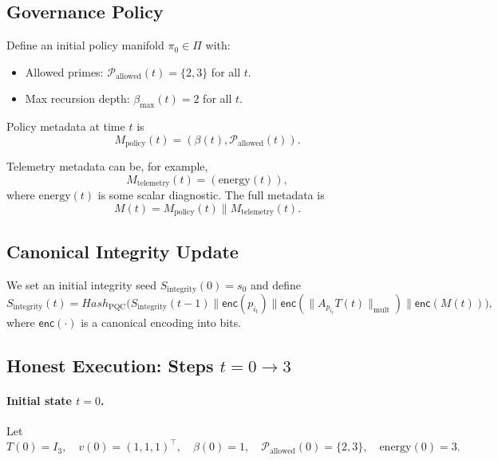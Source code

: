 \documentclass[11pt]{article}
\begin{document}
\subsection{Governance Policy}

Define an initial policy manifold \(\pi_0 \in \Pi\) with:

\begin{itemize}[leftmargin=1.5em]
  \item Allowed primes: \(\mathcal{P}_{\text{allowed}}(t) = \{2,3\}\) for all \(t\).
  \item Max recursion depth: \(\beta_{\max}(t) = 2\) for all \(t\).
\end{itemize}

Policy metadata at time \(t\) is
\[
  M_{\text{policy}}(t) = (\beta(t), \mathcal{P}_{\text{allowed}}(t)).
\]

Telemetry metadata can be, for example,
\[
  M_{\text{telemetry}}(t) = (\text{energy}(t)),
\]
where \(\text{energy}(t)\) is some scalar diagnostic.
The full metadata is
\[
  M(t) = M_{\text{policy}}(t) \parallel M_{\text{telemetry}}(t).
\]

\subsection{Canonical Integrity Update}

We set an initial integrity seed \(S_{\text{integrity}}(0) = s_0\) and define
\begin{equation}
  S_{\text{integrity}}(t)
  =
  Hash_{\text{PQC}}\Big(
    S_{\text{integrity}}(t-1)
    \parallel \mathsf{enc}(p_{i_t})
    \parallel \mathsf{enc}(\|A_{p_{i_t}}T(t)\|_{\text{mult}})
    \parallel \mathsf{enc}(M(t))
  \Big),
\end{equation}
where \(\mathsf{enc}(\cdot)\) is a canonical encoding into bits.

\subsection{Honest Execution: Steps \(t=0 \to 3\)}

\paragraph{Initial state \(t=0\).}

Let
\[
  T(0) = I_3, \quad
  v(0) = (1,1,1)^\top, \quad
  \beta(0) = 1, \quad
  \mathcal{P}_{\text{allowed}}(0) = \{2,3\}, \quad
  \text{energy}(0) = 3.
\]
\end{document}
